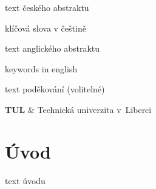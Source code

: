 \documentclass[
BP,bw,print,a4paper,11pt,fonts,numbering,twoside,margins,longappendices,italiccaps
]{./tulpackage/tulthesis}
\begin{document}

\begin{abstractCZ}[wide]
text českého abstraktu
\end{abstractCZ}

\begin{keywordsCZ}[wide]
klíčová slova v češtině
\end{keywordsCZ}

\vspace{2cm}

\begin{abstractEN}[wide]
text anglického abstraktu
\end{abstractEN}

\begin{keywordsEN}[wide]
keywords in english
\end{keywordsEN}

\clearpage

\begin{acknowledgement}[wide]
text poděkování (volitelné)
\end{acknowledgement}

\TULthesisTOC{}

\listoffigures%
\vspace{10em}
\listoftables%
\clearpage
\listoflistings%
\clearpage

\begin{abbreviations}
\textbf{TUL} & Technická univerzita v~Liberci \\
\end{abbreviations}

\cleardoublepage%


\chapter*{Úvod}
text úvodu

\cleardoublepage%
\end{document}
